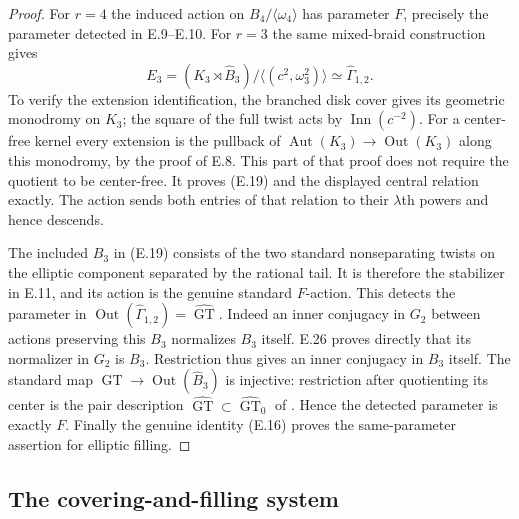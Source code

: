 \begin{proof}
For $r=4$ the induced action on
$B_4/\langle\omega _4\rangle$ has parameter $F$, precisely
the parameter detected in E.9--E.10.  For $r=3$ the same
mixed-braid construction gives
\[
 E_3=(K_3\rtimes\widehat B_3)/
       \langle(c^2,\omega _3^2)\rangle
       \simeq\widehat\Gamma_{1,2}.                       \tag{E.19}
\]
To verify the extension identification, the branched disk cover
gives its geometric monodromy on $K_3$; the square of the
full twist acts by $\operatorname{Inn}(c^{-2})$.  For a
center-free kernel every extension is the pullback of
$\operatorname{Aut}(K_3)\to\operatorname{Out}(K_3)$ along
this monodromy, by the proof of E.8.  This part of that proof
does not require the quotient to be center-free.
It proves (E.19) and the displayed central relation exactly.
The action sends both entries of that relation to their
$\lambda$th powers and hence descends.

The included $B_3$ in (E.19) consists of the two standard
nonseparating twists on the elliptic component separated by
the rational tail.  It is therefore the stabilizer in E.11,
and its action is the genuine standard $F$-action.  This
detects the parameter in
$\operatorname{Out}(\widehat\Gamma_{1,2})=
\widehat{\operatorname{GT}}$.
Indeed an inner conjugacy in $G_2$ between actions preserving
this $B_3$ normalizes $B_3$ itself.  E.26 proves directly that
its normalizer in $G_2$ is $B_3$.
Restriction thus gives an inner conjugacy in $B_3$ itself.
The standard map
$\widehat{\operatorname{GT}}\to\operatorname{Out}(\widehat B_3)$
is injective: restriction after quotienting its center is the
pair description
$\widehat{\operatorname{GT}}\subset
\widehat{\operatorname{GT}}_0$ of
\cite[\S0.3 and Main Theorem (a)]{ET_HS2000}.
Hence the detected parameter is exactly $F$.
Finally the genuine identity (E.16) proves the same-parameter
assertion for elliptic filling.
\end{proof}

\subsection{The covering-and-filling system}

